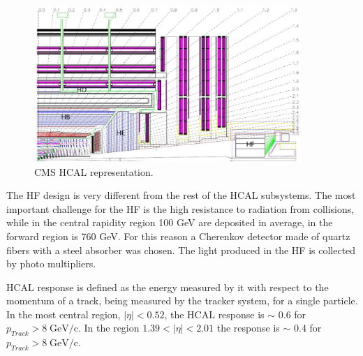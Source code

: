 \begin{figure}[!Hhtbp]
  \begin{center}
    \includegraphics[width=0.9\textwidth]{figs/HCAL.png}
    \caption{CMS HCAL representation. }
    \label{fig:hcal}
  \end{center}
\end{figure}

The HF design is very different from the rest of the HCAL subsystems. The most important challenge for the HF is the high resistance to radiation from collisions, while in the central rapidity region 100 GeV are deposited in average, in the forward region is 760 GeV. For this reason a Cherenkov detector made of quartz fibers with a steel absorber was chosen. The light produced in the HF is collected by photo multipliers. 

HCAL response is defined as the energy measured by it with respect to the momentum of a track, being measured by the tracker system, for a single particle. In the most central region, $|\eta|<0.52$, the HCAL response is $\sim$ 0.6 for ${p_{Track}>8\;\text{GeV/c}}$. In the region $1.39<|\eta|<2.01$ the response is $\sim$ 0.4 for ${p_{Track}>8\;\text{GeV/c}}$.

%


